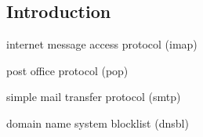 
\subsection{Introduction}


internet message access protocol (imap)

post office protocol (pop)

simple mail transfer protocol (smtp)

domain name system blocklist (dnsbl)
